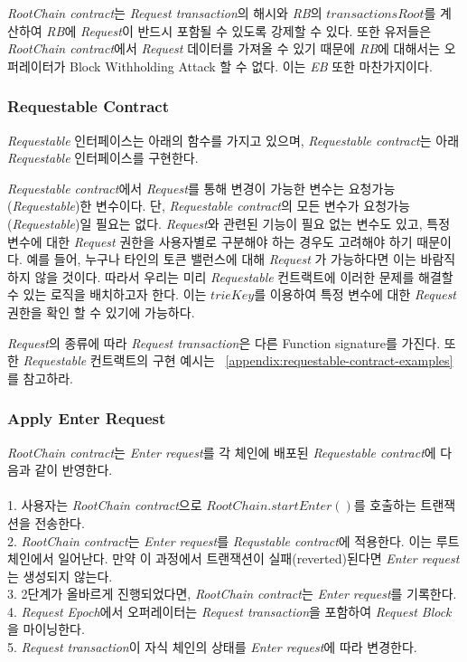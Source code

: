 \documentclass[letterpaper, 11pt]{article}
\begin{document}
\begin{CJK}{UTF8}{mj}
\begin{CJK}{UTF8}{mj}
\emph{RootChain contract}는 \emph{Request transaction}의 해시와 \emph{RB}의 $transactionsRoot$를 계산하여 \emph{RB}에 \emph{Request}이 반드시 포함될 수 있도록 강제할 수 있다. 또한 유저들은 \emph{RootChain contract}에서 \emph{Request} 데이터를 가져올 수 있기 때문에 \emph{RB}에 대해서는 오퍼레이터가 Block Withholding Attack 할 수 없다. 이는 \emph{EB} 또한 마찬가지이다.
\end{CJK}

\subsubsection{Requestable Contract}
\begin{CJK}{UTF8}{mj}
\emph{Requestable} 인터페이스는 아래의 함수를 가지고 있으며, \emph{Requestable contract}는 아래 \emph{Requestable} 인터페이스를 구현한다.



\emph{Requestable contract}에서 \emph{Request}를 통해 변경이 가능한 변수는 요청가능(\emph{Requestable})한 변수이다. 단, \emph{Requestable contract}의 모든 변수가 요청가능(\emph{Requestable})일 필요는 없다. \emph{Request}와 관련된 기능이 필요 없는 변수도 있고, 특정 변수에 대한 \emph{Request} 권한을 사용자별로 구분해야 하는 경우도 고려해야 하기 때문이다. 예를 들어, 누구나 타인의 토큰 밸런스에 대해 \emph{Request} 가 가능하다면 이는 바람직하지 않을 것이다. 따라서 우리는 미리 \emph{Requestable} 컨트랙트에 이러한 문제를 해결할 수 있는 로직을 배치하고자 한다. 이는 $trieKey$를 이용하여 특정 변수에 대한 \emph{Request} 권한을 확인 할 수 있기에 가능하다.

\emph{Request}의 종류에 따라 \emph{Request transaction}은 다른 Function signature를 가진다. 또한 \emph{Requestable} 컨트랙트의 구현 예시는 ~\ref{appendix:requestable-contract-examples}를 참고하라.
\end{CJK}

\subsubsection{Apply Enter Request}
\begin{CJK}{UTF8}{mj}
\emph{RootChain contract}는 \emph{Enter request}를 각 체인에 배포된 \emph{Requestable contract}에 다음과 같이 반영한다.\\
\\
1. 사용자는 \emph{RootChain contract}으로 $RootChain.startEnter()$를 호출하는 트랜잭션을 전송한다. \\
2. \emph{RootChain contract}는 \emph{Enter request}를 \emph{Requstable contract}에 적용한다. 이는 루트 체인에서 일어난다. 만약 이 과정에서 트랜잭션이 실패(reverted)된다면 \emph{Enter request}는 생성되지 않는다.\\
3. 2단계가 올바르게 진행되었다면, \emph{RootChain contract}는 \emph{Enter request}를 기록한다.\\
4. \emph{Request Epoch}에서 오퍼레이터는 \emph{Request transaction}을 포함하여 \emph{Request Block}을 마이닝한다.\\
5. \emph{Request transaction}이 자식 체인의 상태를 \emph{Enter request}에 따라 변경한다.


\end{CJK}
\end{CJK}
\end{document}

